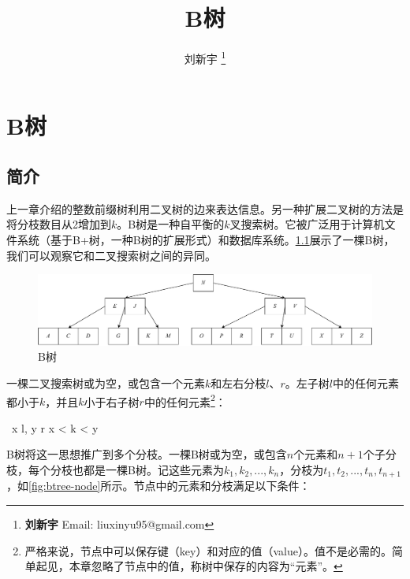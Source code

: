 \documentclass[b5paper]{ctexart}
\begin{document}
\title{B树}

\author{刘新宇
\thanks{{\bfseries 刘新宇 } \newline
  Email: liuxinyu95@gmail.com \newline}
  }

\maketitle
\fi


\ifx\wholebook\relax
\chapter{B树}
\fi

\section{简介}
\label{introduction}

上一章介绍的整数前缀树利用二叉树的边来表达信息。另一种扩展二叉树的方法是将分枝数目从2增加到$k$。B树是一种自平衡的$k$叉搜索树\cite{wiki-b-tree}。它被广泛用于计算机文件系统（基于B+树，一种B树的扩展形式）和数据库系统。\cref{fig:btree-example}展示了一棵B树，我们可以观察它和二叉搜索树之间的异同。

\begin{figure}[htbp]
  \centering
  \includegraphics[scale=0.33]{img/btree-del-before}
  \caption{B树}
  \label{fig:btree-example}
\end{figure}

一棵二叉搜索树或为空，或包含一个元素$k$和左右分枝$l$、$r$。左子树$l$中的任何元素都小于$k$，并且$k$小于右子树$r$中的任何元素\footnote{严格来说，节点中可以保存键（key）和对应的值（value）。值不是必需的。简单起见，本章忽略了节点中的值，称树中保存的内容为“元素”。}：

\be
\forall\ x \in l, y \in r \Rightarrow x < k < y
\ee

B树将这一思想推广到多个分枝。一棵B树或为空，或包含$n$个元素和$n + 1$个子分枝，每个分枝也都是一棵B树。记这些元素为$k_1, k_2, ..., k_n$，分枝为$t_1, t_2, ..., t_n, t_{n+1}$，如\cref{fig:btree-node}所示。节点中的元素和分枝满足以下条件：
\end{document}
